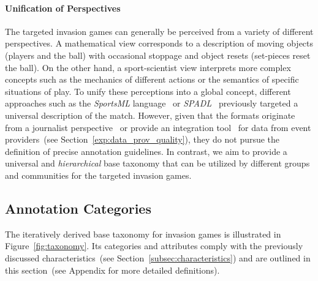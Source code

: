 \paragraph{Unification of Perspectives}
The targeted invasion games can generally be perceived from a variety of different perspectives. A mathematical view corresponds to a description of moving objects (players and the ball) with occasional stoppage and object resets (set-pieces reset the ball). On the other hand, a sport-scientist view interprets more complex concepts such as the mechanics of different actions or the semantics of specific situations of play.      
To unify these perceptions into a global concept, different approaches such as the \emph{SportsML} language~\cite{SportsML} or \emph{SPADL}~\cite{decroos2019actions} previously targeted a universal description of the match. However, given that the formats originate from a journalist perspective~\cite{SportsML} or provide an integration tool~\cite{decroos2019actions} for data from event providers~(see Section~\ref{exp:data_prov_quality}), they do not pursue the definition of precise annotation guidelines.
In contrast, we aim to provide a universal and \textit{hierarchical} base taxonomy that can be utilized by different groups and communities for the targeted invasion games.

\subsection{Annotation Categories}\label{subsec:categories}
The iteratively derived base taxonomy for invasion games is illustrated in Figure~\ref{fig:taxonomy}. Its %
categories and attributes comply with the previously discussed characteristics~(see Section~\ref{subsec:characteristics}) and are outlined in this section~(see Appendix for more detailed definitions).


